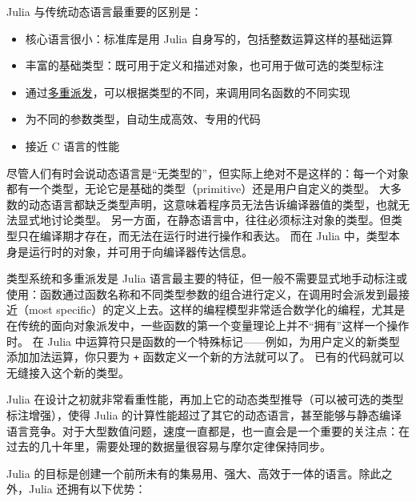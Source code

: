 Julia 与传统动态语言最重要的区别是：



\begin{itemize}
\item 核心语言很小：标准库是用 Julia 自身写的，包括整数运算这样的基础运算


\item 丰富的基础类型：既可用于定义和描述对象，也可用于做可选的类型标注


\item 通过\href{https://discourse.juliacn.com/t/topic/4203\#multiple-dispatch}{多重派发}，可以根据类型的不同，来调用同名函数的不同实现


\item 为不同的参数类型，自动生成高效、专用的代码


\item 接近 C 语言的性能

\end{itemize}


尽管人们有时会说动态语言是“无类型的”，但实际上绝对不是这样的：每一个对象都有一个类型，无论它是基础的类型（primitive）还是用户自定义的类型。 大多数的动态语言都缺乏类型声明，这意味着程序员无法告诉编译器值的类型，也就无法显式地讨论类型。 另一方面，在静态语言中，往往必须标注对象的类型。但类型只在编译期才存在，而无法在运行时进行操作和表达。 而在 Julia 中，类型本身是运行时的对象，并可用于向编译器传达信息。



类型系统和多重派发是 Julia 语言最主要的特征，但一般不需要显式地手动标注或使用：函数通过函数名称和不同类型参数的组合进行定义，在调用时会派发到最接近（most specific）的定义上去。这样的编程模型非常适合数学化的编程，尤其是在传统的面向对象派发中，一些函数的第一个变量理论上并不“拥有”这样一个操作时。 在 Julia 中运算符只是函数的一个特殊标记——例如，为用户定义的新类型添加加法运算，你只要为 \texttt{+} 函数定义一个新的方法就可以了。 已有的代码就可以无缝接入这个新的类型。



Julia 在设计之初就非常看重性能，再加上它的动态类型推导（可以被可选的类型标注增强），使得 Julia 的计算性能超过了其它的动态语言，甚至能够与静态编译语言竞争。对于大型数值问题，速度一直都是，也一直会是一个重要的关注点：在过去的几十年里，需要处理的数据量很容易与摩尔定律保持同步。



Julia 的目标是创建一个前所未有的集易用、强大、高效于一体的语言。除此之外，Julia 还拥有以下优势：



